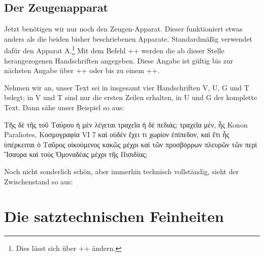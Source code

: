 \subsection{Der Zeugenapparat}

Jetzt benötigen wir nur noch den Zeugen-Apparat. Dieser funktioniert etwas anders als die beiden bisher beschriebenen 
Apparate. Standardmäßig verwendet \reledmac dafür den Apparat A.\footnote{Dies lässt sich über ++ ändern.} 
Mit dem Befehl ++ werden die ab dieser Stelle herangezogenen Handschriften angegeben. Diese Angabe ist gültig bis 
zur nächsten Angabe über ++ oder bis zu einem +\stopmsdata+.

Nehmen wir an, unser Text sei in insgesamt vier Handschriften V, U, G und T belegt; 
in V und T sind nur die ersten Zeilen erhalten, in U und G der komplette Text. Dann sähe unser Beispiel so aus:

\begin{lfgwcode}{}
Τῆς  δὲ τῆς  
τοῦ Ταύρου ἡ μὲν λέγεται τραχεῖα ἡ δὲ πεδιάς;
τραχεῖα μέν, ἧς %
{Konon Paraliotes, Κοσμογραφία VI 7} καὶ οὐδὲν 
 ἔχει τι χωρίον
ἐπίπεδον, καὶ ἔτι ἧς ὑπέρκειται ὁ Ταῦρος οἰκούμενος κακῶς μέχρι καὶ τῶν
προσβόρρων πλευρῶν τῶν περὶ Ἴσαυρα καὶ τοὺς Ὁμοναδέας μέχρι τῆς Πισιδίας;
\end{lfgwcode}

Noch nicht sonderlich schön, aber immerhin technisch vollständig, sieht der Zwischenstand so aus:

\label{Pilhofer-Beispiel-Lemma-kurz}%
\begin{reledmacbsp}{\bsplineenum}
\end{reledmacbsp}


\section{Die satztechnischen Feinheiten}

